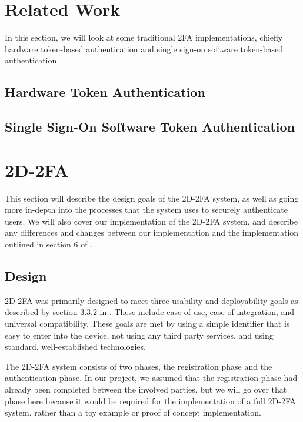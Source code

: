 \documentclass[11pt]{article} %
\begin{document}
\section{Related Work}

In this section, we will look at some traditional 2FA implementations,
chiefly hardware token-based authentication and single sign-on software
token-based authentication.

\subsection{Hardware Token Authentication}



\subsection{Single Sign-On Software Token Authentication}




\section{2D-2FA}

This section will describe the design goals of the 2D-2FA system, as
well as going more in-depth into the processes that the system uses to
securely authenticate users. We will also cover our implementation of
the 2D-2FA system, and describe any differences and changes between our
implementation and the implementation outlined in section 6 of
\cite{shirvanian2d2fa}. 


\subsection{Design}

2D-2FA was primarily designed to meet three usability and deployability
goals as described by section 3.3.2 in \cite{shirvanian2d2fa}. These
include ease of use, ease of integration, and universal compatibility.
These goals are met by using a simple identifier that is easy to enter
into the device, not using any third party services, and using standard,
well-established technologies. 

The 2D-2FA system consists of two phases, the registration phase and the
authentication phase. In our project, we assumed that the registration
phase had already been completed between the involved parties, but we
will go over that phase here because it would be required for the
implementation of a full 2D-2FA system, rather than a toy example or
proof of concept implementation.
\end{document}
